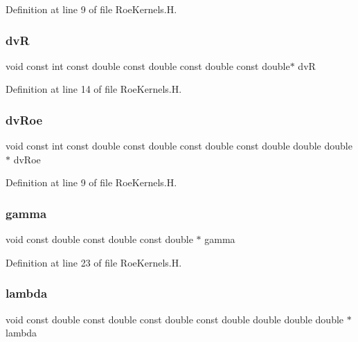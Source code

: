 Definition at line 9 of file Roe\+Kernels.\+H.

\hypertarget{RoeKernels_8H_a707f1194fbf12a091390be0a7f5b60b1}{}\label{RoeKernels_8H_a707f1194fbf12a091390be0a7f5b60b1} 
\subsubsection{\texorpdfstring{dvR}{dvR}}
{\footnotesize\ttfamily void const int const double const double const double const double$\ast$ dvR}



Definition at line 14 of file Roe\+Kernels.\+H.

\hypertarget{RoeKernels_8H_a642571b2454da1bb84221249e107f82a}{}\label{RoeKernels_8H_a642571b2454da1bb84221249e107f82a} 
\subsubsection{\texorpdfstring{dv\+Roe}{dvRoe}}
{\footnotesize\ttfamily void const int const double const double const double const double double double $\ast$ dv\+Roe}



Definition at line 9 of file Roe\+Kernels.\+H.

\hypertarget{RoeKernels_8H_aa94841cd8b113b2af1e594fe6b13c9ee}{}\label{RoeKernels_8H_aa94841cd8b113b2af1e594fe6b13c9ee} 
\subsubsection{\texorpdfstring{gamma}{gamma}}
{\footnotesize\ttfamily void const double const double const double $\ast$ gamma}



Definition at line 23 of file Roe\+Kernels.\+H.

\hypertarget{RoeKernels_8H_a89211c91f7e80725e4791ef58e043244}{}\label{RoeKernels_8H_a89211c91f7e80725e4791ef58e043244} 
\subsubsection{\texorpdfstring{lambda}{lambda}}
{\footnotesize\ttfamily void const double const double const double const double double double double $\ast$ lambda}



